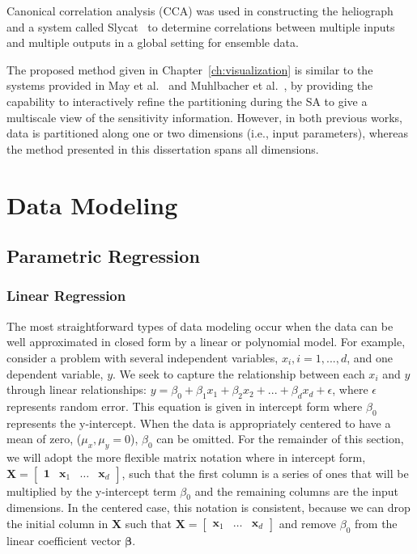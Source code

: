Canonical correlation analysis (CCA) was used in constructing the heliograph~\cite{DeganiShaftoOlson2006} and a system called Slycat~\cite{CrossnoSheadSielicki2015} to determine correlations between multiple inputs and multiple outputs in a global setting for ensemble data.

The proposed method given in Chapter~\ref{ch:visualization} is similar to the systems provided in May et al.~\cite{MayBannachDavey2011} and Muhlbacher et al.~\cite{MuhlbacherPiringer2013}, by providing the capability to interactively refine the partitioning during the SA to give a multiscale view of the sensitivity information.
%
However, in both previous works, data is partitioned along one or two dimensions (i.e., input parameters), whereas the method presented in this dissertation spans all dimensions.

\section{Data Modeling}
\label{sec:regression}
\subsection{Parametric Regression}
\subsubsection{Linear Regression}
The most straightforward types of data modeling occur when the data can be well approximated in closed form by a linear or polynomial model.
%
For example, consider a problem with several independent variables, $x_i, i=1,...,d$, and one dependent variable, $y$.
%
We seek to capture the relationship between each $x_i$ and $y$ through linear relationships: $y = \beta_0 + \beta_1 x_1 + \beta_2 x_2 + ... + \beta_d x_d + \epsilon$, where $\epsilon$ represents random error.
%
This equation is given in intercept form where $\beta_0$ represents the y-intercept.
%
When the data is appropriately centered to have a mean of zero, ($\mu_x,\mu_y = 0$), $\beta_0$ can be omitted.
%
For the remainder of this section, we will adopt the more flexible matrix notation where in intercept form, $\mathbf{X} = \begin{bmatrix}\mathbf{1} & \mathbf{x}_1 & \ldots & \mathbf{x}_d \end{bmatrix}$, such that the first column is a series of ones that will be multiplied by the y-intercept term $\beta_0$ and the remaining columns are the input dimensions.
%
In the centered case, this notation is consistent, because we can drop the initial column in $\mathbf{X}$ such that $\mathbf{X} = \begin{bmatrix}\mathbf{x}_1 & \ldots & \mathbf{x}_d\end{bmatrix}$ and remove $\beta_0$ from the linear coefficient vector $\boldsymbol\beta$.

